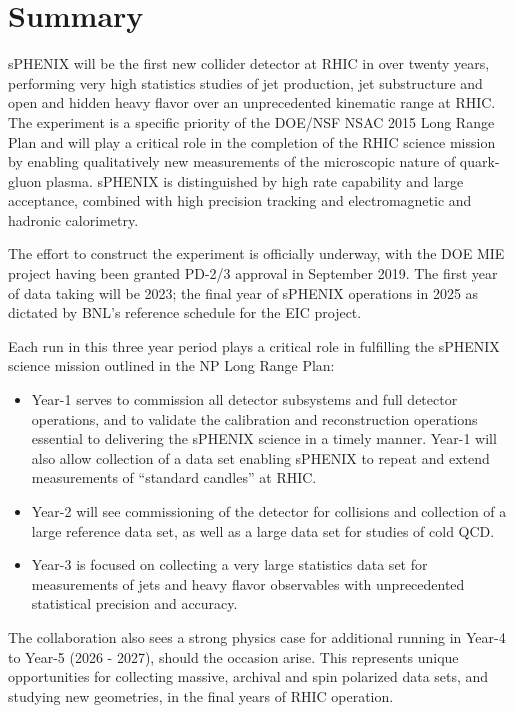 \chapter{Summary}
\label{chap:summary}

sPHENIX will be the first new collider detector at RHIC in over twenty
years,  performing very high statistics studies of jet
production, jet substructure and open and hidden heavy flavor over an
unprecedented kinematic range at RHIC.  The experiment
is a specific priority of the DOE/NSF NSAC 2015 Long Range Plan and 
will play a critical role in the completion of the RHIC science mission by enabling qualitatively
new measurements of the microscopic nature of quark-gluon plasma.
sPHENIX is distinguished by high rate capability and large acceptance, 
combined with high precision tracking and electromagnetic and hadronic calorimetry.

The effort to construct the experiment is officially underway, with
the DOE MIE project having been granted PD-2/3 approval in September
2019. The first year of data taking will be 2023; the final year of sPHENIX operations in
2025 as dictated by BNL's reference schedule for the EIC project.

Each run in this three year period plays a critical role in fulfilling the 
sPHENIX science mission outlined in the NP Long Range Plan:
\begin{itemize}
\item Year-1 serves to commission all detector subsystems and full
  detector operations, and to validate the calibration and
  reconstruction operations essential to delivering the sPHENIX
  science in a timely manner.  Year-1 will
  also allow collection of a \auau data set enabling sPHENIX to repeat
  and extend measurements of ``standard candles'' at RHIC.
\item Year-2 will see commissioning of the detector for \pp collisions
 and collection of a large \pp reference data set, as well as a large \pAu data set
  for studies of cold QCD.
\item Year-3 is focused on collecting a very large statistics \auau
 data set for measurements of jets and heavy flavor observables with
  unprecedented statistical precision and accuracy.
\end{itemize}

The collaboration also sees a strong physics case for additional running in Year-4 to Year-5 (2026 - 2027), should the occasion
arise. This represents unique opportunities for collecting massive,
archival \apa and spin polarized \pp data sets, and studying new geometries, in the final years of
RHIC operation. 
